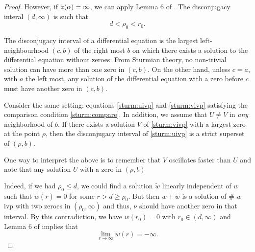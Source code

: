 \begin{proof}
However, if $z(\alpha) = \infty$, we can apply Lemma 6 of \cite[p.~249]{kwong}. The
disconjugacy interal $(d, \infty)$ is such that 
\[ d < \rho_0 < r_0. \]

\donegroup
The disconjugacy interval of a differential equation is the largest
left-neighbourhood $(c, b)$ of the {\red right most} $b$ on which there
exists a solution to the differential equation without zeroes. From Sturmian
theory, no non-trivial solution can have more than one zero in $(c, b)$. On
the other hand, unless $c = a$, with $a$ the {\red left most}, any solution
of the differential equation with a zero before $c$ must have another zero
in $(c, b)$. 
\endgroup

Consider the same setting: equations \eqref{sturm:uivp} and
\eqref{sturm:vivp} satisfying the comparison condition
\eqref{sturm:compare}. In addition, we assume that $U \neq V$ in \emph{any}
neighborhood of $b$. If there exists a solution $V$ of \eqref{sturm:vivp}
with a largest zero at the point $\rho$, then the disconjugacy interval of
\eqref{sturm:uivp} is a strict superset of $(\rho, b)$. 

One way to interpret the above is to remember that $V$ oscillates faster
than $U$ and note that any solution $U$ with a zero in $(\rho, b)$ 

Indeed, if we had $\rho_0 \leq d$, we could find a solution $\tilde{w}$ linearly
independent of $w$ such that $\tilde{w}(\tilde{r}) = 0$ for some $\tilde{r} > d
\geq \rho_0$. But then $w + \tilde{w}$ is a solution of \# $w$ ivp with two
zeroes in $(\rho_0, \infty)$ and thus, $\nu$ should have another zero in {\red that
interval}. By this contradiction, we have $w(r_0) = 0$ with $r_0 \in (d,
\infty)$ and Lemma 6 of \cite[p.~249]{kwong} implies that
\[ \underset{r\to\infty}{\lim} w(r) = -\infty. \]



\end{proof}
